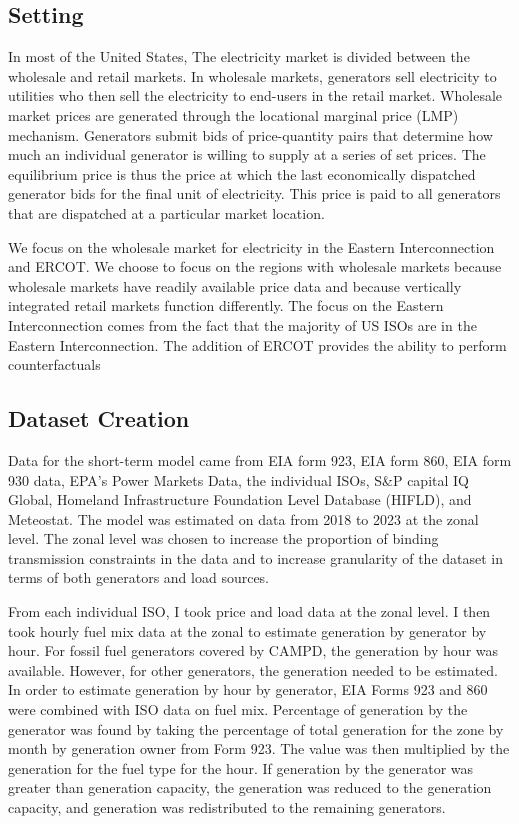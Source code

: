 \documentclass[12pt]{article}
\begin{document}
\subsection{Setting}
In most of the United States, The electricity market is divided between the wholesale and retail markets. In wholesale markets, generators sell electricity to utilities who then sell the electricity to end-users in the retail market. Wholesale market prices are generated through the locational marginal price (LMP) mechanism. Generators submit bids of price-quantity pairs that determine how much an individual generator is willing to supply at a series of set prices. The equilibrium price is thus the price at which the last economically dispatched generator bids for the final unit of electricity. This price is paid to all generators that are dispatched at a particular market location.

We focus on the wholesale market for electricity in the Eastern Interconnection and ERCOT. We choose to focus on the regions with wholesale markets because wholesale markets have readily available price data and because vertically integrated retail markets function differently. The focus on the Eastern Interconnection comes from the fact that the majority of US ISOs are in the Eastern Interconnection. The addition of ERCOT provides the ability to perform counterfactuals 

\subsection{Dataset Creation}

Data for the short-term model came from EIA form 923, EIA form 860, EIA form 930 data, EPA's Power Markets Data, the individual ISOs, S\&P capital IQ Global, Homeland Infrastructure Foundation Level Database (HIFLD), and Meteostat. The model was estimated on data from 2018 to 2023 at the zonal level. The zonal level was chosen to increase the proportion of binding transmission constraints in the data and to increase granularity of the dataset in terms of both generators and load sources.

From each individual ISO, I took price and load data at the zonal level. I then took hourly fuel mix data at the zonal to estimate generation by generator by hour. For fossil fuel generators covered by CAMPD, the generation by hour was available. However, for other generators, the generation needed to be estimated. In order to estimate generation by hour by generator, EIA Forms 923 and 860 were combined with ISO data on fuel mix. Percentage of generation by the generator was found by taking the percentage of total generation for the zone by month by generation owner from Form 923. The value was then multiplied by the generation for the fuel type for the hour. If generation by the generator was greater than generation capacity, the generation was reduced to the generation capacity, and generation was redistributed to the remaining generators.
\end{document}
